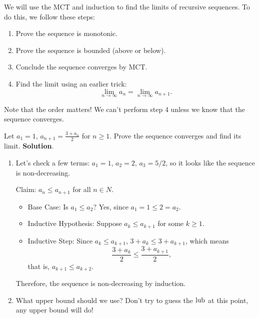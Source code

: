 We will use the MCT and induction to find the limits of recursive sequences.
To do this, we follow these steps:
\begin{enumerate}[(1)]
    \item Prove the sequence is monotonic.
    \item Prove the sequence is bounded (above or below).
    \item Conclude the sequence converges by MCT\@.
    \item Find the limit using an earlier trick:
          \[ \lim\limits_{{n} \to {\infty}}a_n=\lim\limits_{{n} \to {\infty}}a_{n+1}. \]
\end{enumerate}
Note that the order matters! We can't perform step 4 unless we know
that the sequence converges.
\begin{Example}{}{}
    Let $ a_1=1 $, $ a_{n+1}=\frac{3+a_n}{2} $ for $ n\ge 1 $. Prove
    the sequence converges and find its limit.
    \tcblower{}
    \textbf{Solution}.
    \begin{enumerate}[(1)]
        \item Let's check a few terms: $ a_1=1 $, $ a_2=2 $, $ a_3=5/2 $,
              so it looks like the sequence is non-decreasing.

              Claim: $ a_n\le a_{n+1} $ for all $ n\in N $.
              \begin{itemize}
                  \item Base Case: Is $ a_1\le a_2 $? Yes, since $ a_1=1\le 2=a_2 $.
                  \item Inductive Hypothesis: Suppose $ a_k\le a_{k+1} $ for
                        some $ k\ge 1 $.
                  \item Inductive Step: Since $ a_k\le a_{k+1} $, $ 3+a_{k}\le 3+a_{k+1} $,
                        which means
                        \[ \frac{3+a_k}{2}\le \frac{3+a_{k+1}}{2}, \]
                        that is, $ a_{k+1}\le a_{k+2} $.
              \end{itemize}
              Therefore, the sequence is non-decreasing by induction.
        \item What upper bound should we use? Don't try to guess the $ \mathrm{lub} $
              at this point, any upper bound will do!


\end{enumerate}
\end{Example}
